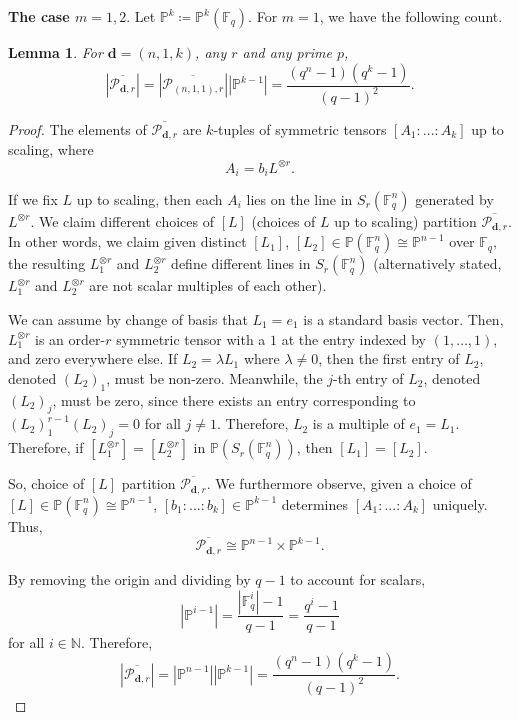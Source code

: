 \documentclass[a4paper]{cas-sc}
\newcommand{\dd}{\mathbf{d}}    %
\newcommand{\F}{\mathbb{F}}
\renewcommand{\P}{\mathbb{P}}
\newtheorem{lemma}[theorem]{Lemma}
\begin{document}
    \noindent
    \textbf{The case $m=1,2$}. Let $\mathbb{P}^k \coloneq \mathbb{P}^k(\F_q)$. For $m=1$, we have the following count.
    \begin{lemma} 
    \label{lem: n_1_k}
    For $\dd = (n,1,k)$, any $r$ and any prime $p$,
    \[
        |\overline{\mathcal{P}_{\dd,r}}| = |\overline{\mathcal{P}_{(n,1,1),r}}|\left |\mathbb{P}^{k-1}\right|= \frac{(q^n-1)(q^k-1)}{(q-1)^2}.
    \]
    \end{lemma}
    \begin{proof}
        The elements of $\overline{\mathcal{P}_{\dd,r}}$ are $k$-tuples of symmetric tensors $\left[A_1:...:A_k\right]$ up to scaling, where
        $$A_i = b_i L^{\otimes r}.$$
    
        If we fix $L$ up to scaling, then each $A_i$ lies on the line in $S_r(\F_q^n)$ generated by $L^{\otimes r}$. We claim different choices of $\left[L\right]$ (choices of $L$ up to scaling) partition $\overline{\mathcal{P}_{\dd,r}}$. In other words, we claim given distinct $\left[L_1\right]$, $\left[L_2\right] \in \P(\mathbb{F}_q^n)  \cong \mathbb{P}^{n-1}$ over $\F_q$, the resulting $L_1^{\otimes r}$ and $L_2^{\otimes r}$ define different lines in $S_r(\F_q^n)$ (alternatively stated, $L_1^{\otimes r}$ and $L_2^{\otimes r}$ are not scalar multiples of each other). 
    
        We can assume by change of basis that $L_1 = e_1$ is a standard basis vector. Then, $L_1^{\otimes r}$ is an order-$r$ symmetric tensor with a $1$ at the entry indexed by $(1,\ldots,1)$, and zero everywhere else. If $L_2 = \lambda L_1$ where $\lambda \neq 0$, then the first entry of $L_2$, denoted $(L_2)_1$, must be non-zero. Meanwhile, the $j$-th entry of $L_2$, denoted $(L_2)_j$, must be zero, since there exists an entry corresponding to $(L_2)_1^{r-1}(L_2)_j = 0$ for all $j \neq 1$. Therefore, $L_2$ is a multiple of $e_1 = L_1$. Therefore, if $\left[L_1^{\otimes r}\right] = \left[L_2^{\otimes r}\right]$ in $\P(S_r(\F_q^n))$, then $\left[L_1\right] = \left[L_2\right]$. 
        
        So, choice of $\left[L\right]$ partition $\overline{\mathcal{P}_{\dd,r}}$. We furthermore observe, given a choice of $\left[L\right] \in \P(\F_q^n) \cong \P^{n-1}$, $\left[b_1:...:b_k\right] \in \mathbb{P}^{k-1}$ determines $\left[A_1:...:A_k\right]$ uniquely. Thus,
        $$\overline{\mathcal{P}_{\dd,r}} \cong \P^{n-1} \times \mathbb{P}^{k-1}.$$
    
        By removing the origin and dividing by $q-1$ to account for scalars,
        $$|\P^{i-1}| = \frac{|\F_q^{i}| - 1}{q-1} = \frac{q^i-1}{q-1}$$
        for all $i \in \mathbb{N}$. Therefore,
        $$|\overline{\mathcal{P}_{\dd,r}}| = |\mathbb{P}^{n-1}| |\mathbb{P}^{k-1}| = \frac{(q^n-1)(q^k-1)}{(q-1)^2}.$$
    \end{proof}
\end{document}

